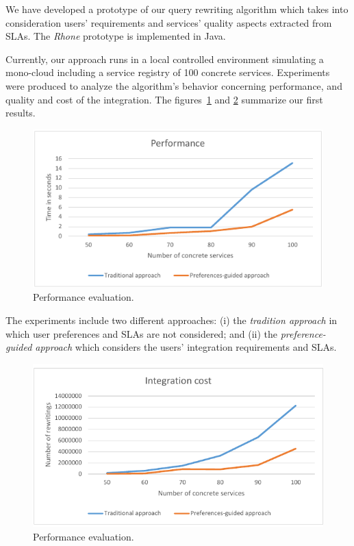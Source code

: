 We have developed a prototype of our query rewriting algorithm which takes into consideration users' requirements and services' quality aspects extracted from SLAs. The \textit{Rhone} prototype is implemented in Java.

Currently, our approach runs in a local controlled environment simulating a mono-cloud including a service registry of 100 concrete services. 
Experiments were produced to analyze the algorithm's behavior concerning performance, and quality and cost of the integration. The figures~\ref{fig01} and \ref{fig02} summarize our first results.

\begin{figure}[!h]
\centering
\includegraphics[scale=0.8]{fig1.pdf}
\caption{Performance evaluation.}\label{fig01}
\end{figure} 

The experiments include two different approaches: (i) the \textit{tradition approach} in which user preferences and SLAs are not considered; and (ii) the \textit{preference-guided approach} which considers the users' integration requirements and SLAs.

\begin{figure}[!h]
\centering
\includegraphics[scale=0.8]{fig2.pdf}
\caption{Performance evaluation.}\label{fig02}
\end{figure} 

